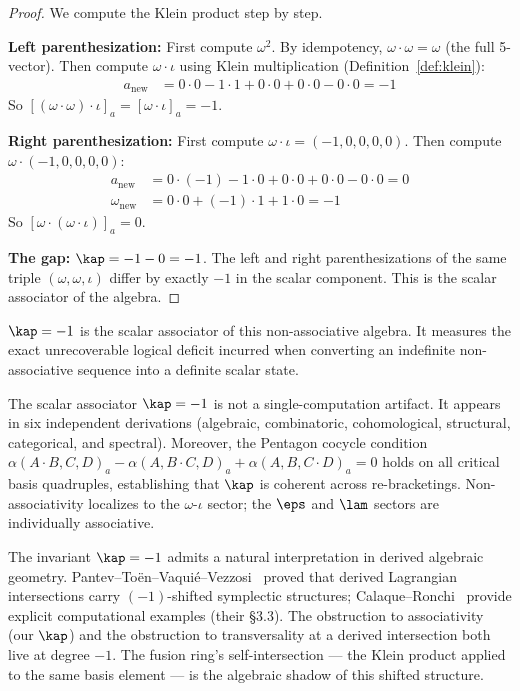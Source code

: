 \begin{proof}
We compute the Klein product step by step.

\textbf{Left parenthesization:} First compute $\omega^2$. By idempotency, $\omega \cdot \omega = \omega$ (the full 5-vector). Then compute $\omega \cdot \iota$ using Klein multiplication (Definition~\ref{def:klein}):
\begin{align*}
a_{\mathrm{new}} &= 0 \cdot 0 - 1 \cdot 1 + 0 \cdot 0 + 0 \cdot 0 - 0 \cdot 0 = -1
\end{align*}
So $[(\omega \cdot \omega) \cdot \iota]_a = [\omega \cdot \iota]_a = -1$.

\textbf{Right parenthesization:} First compute $\omega \cdot \iota = (-1, 0, 0, 0, 0)$. Then compute $\omega \cdot (-1, 0, 0, 0, 0)$:
\begin{align*}
a_{\mathrm{new}} &= 0 \cdot (-1) - 1 \cdot 0 + 0 \cdot 0 + 0 \cdot 0 - 0 \cdot 0 = 0 \\
\omega_{\mathrm{new}} &= 0 \cdot 0 + (-1) \cdot 1 + 1 \cdot 0 = -1
\end{align*}
So $[\omega \cdot (\omega \cdot \iota)]_a = 0$.

\textbf{The gap:} $\kap = -1 - 0 = -1$. The left and right parenthesizations of the same triple $(\omega, \omega, \iota)$ differ by exactly $-1$ in the scalar component. This is the scalar associator of the algebra. \qedhere
\end{proof}

$\kap = -1$ is the scalar associator of this non-associative algebra. It measures the exact unrecoverable logical deficit incurred when converting an indefinite non-associative sequence into a definite scalar state.

\begin{remark}
The scalar associator $\kap = -1$ is not a single-computation artifact. It appears in six independent derivations (algebraic, combinatoric, cohomological, structural, categorical, and spectral). Moreover, the Pentagon cocycle condition $\alpha(A{\cdot}B, C, D)_a - \alpha(A, B{\cdot}C, D)_a + \alpha(A, B, C{\cdot}D)_a = 0$ holds on all critical basis quadruples, establishing that $\kap$ is coherent across re-bracketings. Non-associativity localizes to the $\omega$-$\iota$ sector; the $\eps$ and $\lam$ sectors are individually associative.
\end{remark}

\begin{remark}
The invariant $\kap = -1$ admits a natural interpretation in derived algebraic geometry. Pantev--To\"en--Vaqui\'e--Vezzosi~\cite{ptvv} proved that derived Lagrangian intersections carry $(-1)$-shifted symplectic structures; Calaque--Ronchi~\cite{calaque-ronchi} provide explicit computational examples (their \S3.3). The obstruction to associativity (our $\kap$) and the obstruction to transversality at a derived intersection both live at degree $-1$. The fusion ring's self-intersection --- the Klein product applied to the same basis element --- is the algebraic shadow of this shifted structure.
\end{remark}

